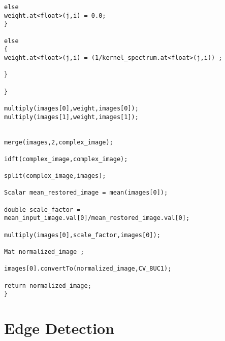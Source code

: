 \begin{lstlisting}
else
weight.at<float>(j,i) = 0.0;
}

else
{
weight.at<float>(j,i) = (1/kernel_spectrum.at<float>(j,i)) ;

}

}

multiply(images[0],weight,images[0]);
multiply(images[1],weight,images[1]);


merge(images,2,complex_image);

idft(complex_image,complex_image);

split(complex_image,images);

Scalar mean_restored_image = mean(images[0]);

double scale_factor = mean_input_image.val[0]/mean_restored_image.val[0];

multiply(images[0],scale_factor,images[0]);

Mat normalized_image ;

images[0].convertTo(normalized_image,CV_8UC1);

return normalized_image;
}

\end{lstlisting}

\pagebreak
\section{Edge Detection}

